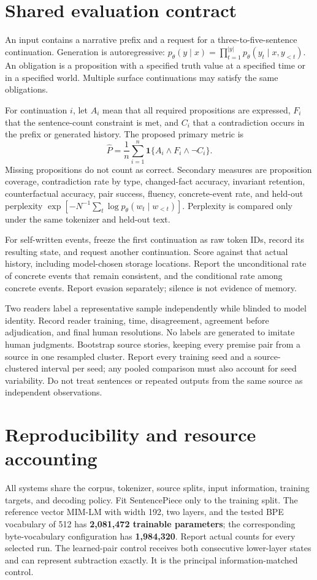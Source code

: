 \section{Shared evaluation contract}
An input contains a narrative prefix and a request for a three-to-five-sentence continuation.
Generation is autoregressive: \(p_\theta(y\mid x)=\prod_{t=1}^{|y|}p_\theta(y_t\mid x,y_{<t})\).
An obligation is a proposition with a specified truth value at a specified time or in
a specified world. Multiple surface continuations may satisfy the same obligations.

For continuation \(i\), let \(A_i\) mean that all required propositions are expressed,
\(F_i\) that the sentence-count constraint is met, and \(C_i\) that a contradiction
occurs in the prefix or generated history. The proposed primary metric is
\[
 \widehat{P}=\frac{1}{n}\sum_{i=1}^n
 \mathbf{1}\{A_i\land F_i\land\neg C_i\}.
\]
Missing propositions do not count as correct. Secondary measures are proposition
coverage, contradiction rate by type, changed-fact accuracy, invariant retention,
counterfactual accuracy, pair success, fluency, concrete-event rate, and held-out
perplexity \(\exp[-N^{-1}\sum_t\log p_\theta(w_t\mid w_{<t})]\).
Perplexity is compared only under the same tokenizer and held-out text.

For self-written events, freeze the first continuation as raw token IDs, record its
resulting state, and request another continuation. Score against that actual history,
including model-chosen storage locations. Report the unconditional rate of concrete
events that remain consistent, and the conditional rate among concrete events.
Report evasion separately; silence is not evidence of memory.

Two readers label a representative sample independently while blinded to model identity.
Record reader training, time, disagreement, agreement before adjudication, and final
human resolutions. No labels are generated to imitate human judgments.
Bootstrap source stories, keeping every premise pair from a source in one resampled
cluster. Report every training seed and a source-clustered interval per seed; any
pooled comparison must also account for seed variability. Do not treat sentences
or repeated outputs from the same source as independent observations.

\section{Reproducibility and resource accounting}
All systems share the corpus, tokenizer, source splits, input information, training
targets, and decoding policy. Fit SentencePiece only to the training split.
The reference vector MIM-LM with width 192, two layers, and the tested BPE vocabulary
of 512 has \textbf{2,081,472 trainable parameters}; the corresponding byte-vocabulary
configuration has \textbf{1,984,320}. Report actual counts for every selected run.
The learned-pair control receives both consecutive lower-layer states and can
represent subtraction exactly. It is the principal information-matched control.

